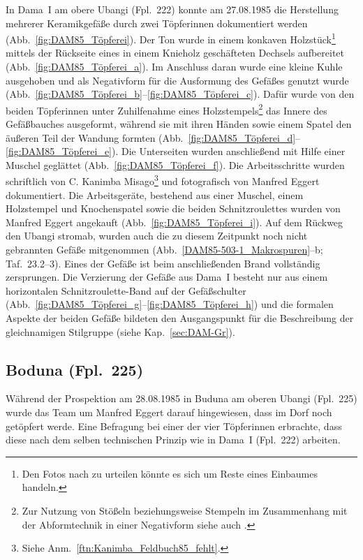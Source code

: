 In Dama~I am obere Ubangi (Fpl.~222) konnte am 27.08.1985 die Herstellung mehrerer Keramikgefäße durch zwei Töpferinnen dokumentiert werden (Abb.~\ref{fig:DAM85_Töpferei}). Der Ton wurde in einem konkaven Holzstück\footnote{Den Fotos nach zu urteilen könnte es sich um Reste eines Einbaumes handeln.} mittels der Rückseite eines in einem Knieholz geschäfteten Dechsels aufbereitet (Abb.~\ref{fig:DAM85_Töpferei_a}). Im Anschluss daran wurde eine kleine Kuhle ausgehoben und als Negativform für die Ausformung des Gefäßes genutzt wurde (Abb.~\ref{fig:DAM85_Töpferei_b}--\ref{fig:DAM85_Töpferei_c}). Dafür wurde von den beiden Töpferinnen unter Zuhilfenahme eines Holzstempels\footnote{Zur Nutzung von Stößeln beziehungsweise Stempeln im Zusammenhang mit der Abformtechnik in einer Negativform siehe auch \textcites{Huysecom.199192}{Huysecom.1996}.} das Innere des Gefäßbauches ausgeformt, während sie mit ihren Händen sowie einem Spatel den äußeren Teil der Wandung formten (Abb.~\ref{fig:DAM85_Töpferei_d}--\ref{fig:DAM85_Töpferei_e}). Die Unterseiten wurden anschließend mit Hilfe einer Muschel geglättet (Abb.~\ref{fig:DAM85_Töpferei_f}). Die Arbeitsschritte wurden schriftlich von C. Kanimba Misago\footnote{Siehe Anm.~\ref{ftn:Kanimba_Feldbuch85_fehlt}.} und fotografisch von Manfred Eggert dokumentiert. Die Arbeitsgeräte, bestehend aus einer Muschel, einem Holzstempel und Knochenspatel sowie die beiden Schnitzroulettes wurden von Manfred Eggert angekauft (Abb.~\ref{fig:DAM85_Töpferei_i}). Auf dem Rückweg den Ubangi stromab, wurden auch die zu diesem Zeitpunkt noch nicht gebrannten Gefäße mitgenommen (Abb.~\ref{DAM85-503-1_Makrospuren}--b; Taf.~23.2--3). Eines der Gefäße ist beim anschließenden Brand vollständig zersprungen. Die Verzierung der Gefäße aus Dama~I besteht nur aus einem horizontalen Schnitzroulette-Band auf der Gefäßschulter (Abb.~\ref{fig:DAM85_Töpferei_g}--\ref{fig:DAM85_Töpferei_h}) und die formalen Aspekte der beiden Gefäße bildeten den Ausgangspunkt für die Beschreibung der gleichnamigen Stilgruppe (siehe Kap.~\ref{sec:DAM-Gr}).


\subsection*{Boduna (Fpl.~225)}

Während der Prospektion am 28.08.1985 in Buduna am oberen Ubangi (Fpl.~225) wurde das Team um Manfred Eggert darauf hingewiesen, dass im Dorf noch getöpfert werde. Eine Befragung bei einer der vier Töpferinnen erbrachte, dass diese nach dem selben technischen Prinzip wie in Dama~I (Fpl.~222) arbeiten.


